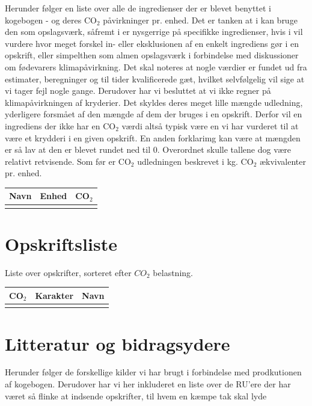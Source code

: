 \documentclass[11pt, a4paper]{article}
\newcommand{\coo}{CO$_2$ }
\begin{document}
Herunder følger en liste over alle de ingredienser der er blevet benyttet i kogebogen - og deres \coo påvirkninger pr. enhed. Det er tanken at i kan bruge den som opslagsværk, såfremt i er nysgerrige på specifikke ingredienser, hvis i vil vurdere hvor meget forskel in- eller eksklusionen af en enkelt ingrediens gør i en opskrift, eller simpelthen som almen opslagsværk i forbindelse med diskussioner om fødevarers klimapåvirkning. Det skal noteres at nogle værdier er fundet ud fra estimater, beregninger og til tider kvalificerede gæt, hvilket selvfølgelig vil sige at vi tager fejl nogle gange. Derudover har vi besluttet at vi ikke regner på klimapåvirkningen af kryderier. Det skyldes deres meget lille mængde udledning, yderligere forsmået af den mængde af dem der bruges i en opskrift. Derfor vil en ingrediens der ikke har en \coo værdi altså typisk være en vi har vurderet til at være et krydderi i en given opskrift. En anden forklarimg kan være at mængden er så lav at den er blevet rundet ned til 0. Overordnet skulle tallene dog være relativt retvisende. Som før er \coo udledningen beskrevet i kg. \coo ækvivalenter pr. enhed.\\
	
	\begin{longtable}{|l|l|l|}
		\hline
\textbf{Navn} & \textbf{Enhed} & \textbf{\coo}\\ \hline
\rucooingredients		
	\end{longtable}

\newpage
\section{Opskriftsliste}

Liste over opskrifter, sorteret efter $CO_2$ belastning.

\begin{longtable}{|l|l|l|}
	\hline
	\textbf{\coo} & \textbf{Karakter} & \textbf{Navn}\\ \hline
	\rucoorecipes		
\end{longtable}

\newpage
\section{Litteratur og bidragsydere}

Herunder følger de forskellige kilder vi har brugt i forbindelse med prodkutionen af kogebogen. Derudover har vi her inkluderet en liste over de RU'ere der har været så flinke at indsende opskrifter, til hvem en kæmpe tak skal lyde
\end{document}
